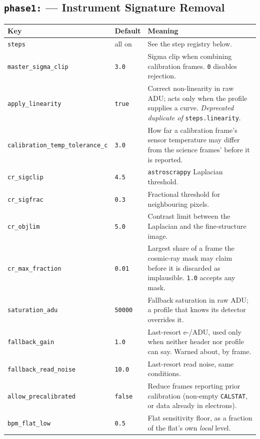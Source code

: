 \documentclass[11pt,a4paper]{article}
\begin{document}
\subsection{\texttt{phase1:} --- Instrument Signature Removal}
\begin{center}
\begin{longtable}{|p{4.6cm}|p{1.9cm}|p{8.0cm}|}
\hline
\textbf{Key} & \textbf{Default} & \textbf{Meaning} \\
\hline
\endhead
\texttt{steps} & all on & See the step registry below. \\
\hline
\texttt{master\_sigma\_clip} & \texttt{3.0} & Sigma clip when combining calibration frames. \texttt{0} disables rejection. \\
\hline
\texttt{apply\_linearity} & \texttt{true} & Correct non-linearity in raw ADU; acts only when the profile supplies a curve. \emph{Deprecated duplicate of} \texttt{steps.linearity}. \\
\hline
\texttt{calibration\_temp\_tolerance\_c} & \texttt{3.0} & How far a calibration frame's sensor temperature may differ from the science frames' before it is reported. \\
\hline
\texttt{cr\_sigclip} & \texttt{4.5} & \texttt{astroscrappy} Laplacian threshold. \\
\hline
\texttt{cr\_sigfrac} & \texttt{0.3} & Fractional threshold for neighbouring pixels. \\
\hline
\texttt{cr\_objlim} & \texttt{5.0} & Contrast limit between the Laplacian and the fine-structure image. \\
\hline
\texttt{cr\_max\_fraction} & \texttt{0.01} & Largest share of a frame the cosmic-ray mask may claim before it is discarded as implausible. \texttt{1.0} accepts any mask. \\
\hline
\texttt{saturation\_adu} & \texttt{50000} & Fallback saturation in raw ADU; a profile that knows its detector overrides it. \\
\hline
\texttt{fallback\_gain} & \texttt{1.0} & Last-resort e-/ADU, used only when neither header nor profile can say. Warned about, by frame. \\
\hline
\texttt{fallback\_read\_noise} & \texttt{10.0} & Last-resort read noise, same conditions. \\
\hline
\texttt{allow\_precalibrated} & \texttt{false} & Reduce frames reporting prior calibration (non-empty \texttt{CALSTAT}, or data already in electrons). \\
\hline
\texttt{bpm\_flat\_low} & \texttt{0.5} & Flat sensitivity floor, as a fraction of the flat's own \emph{local} level. \\

\end{longtable}
\end{center}
\end{document}
